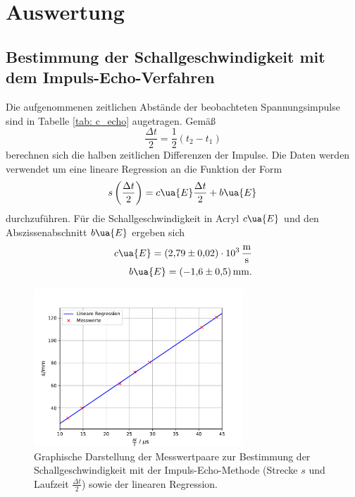 \section{Auswertung}

\subsection{Bestimmung der Schallgeschwindigkeit mit dem Impuls-Echo-Verfahren}
Die aufgenommenen zeitlichen Abstände der beobachteten Spannungsimpulse sind in Tabelle \ref{tab: c_echo}
augetragen. Gemäß
\begin{equation}
  \frac{\Delta t}{2} = \frac{1}{2}\left(t_2 - t_1\right)
\end{equation}
berechnen sich die halben zeitlichen Differenzen der Impulse. Die Daten werden verwendet um eine
lineare Regression an die Funktion der Form
\begin{equation}
  s \left(\frac{\Delta t}{2}\right) = c\ua{E} \frac{\Delta t}{2} + b\ua{E}
\end{equation}
durchzuführen. Für die Schallgeschwindigkeit in Acryl $c\ua{E}$ und den Abszissenabschnitt $b\ua{E}$
ergeben sich
\begin{align}
  \begin{aligned}
    c\ua{E} = \SI{+2.79(2)e+03}{\meter\per\second} \\
    b\ua{E} = \SI{-1.6(5)}{\milli\meter}.
    \label{eq: params_echo}
  \end{aligned}
\end{align}

\begin{figure}[H]
  \centering
  \includegraphics[width = 0.7\textwidth]{../Messdaten/plots/schallgeschwindigkeit.pdf}
  \caption{Graphische Darstellung der Messwertpaare zur Bestimmung der Schallgeschwindigkeit
  mit der Impuls-Echo-Methode (Strecke $s$ und Laufzeit $\frac{\Delta t}{2}$) sowie der linearen Regression.}
  \label{fig: c_echo}
\end{figure}


